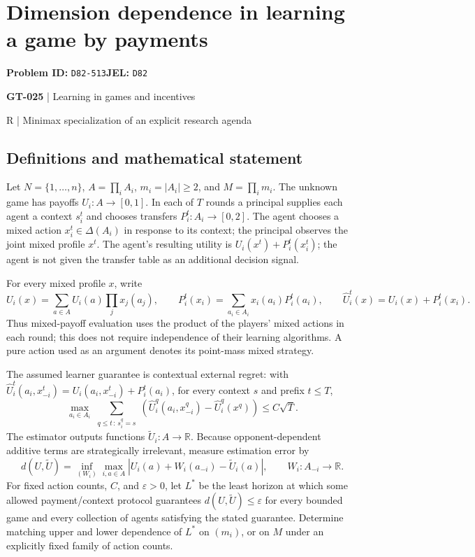 \documentclass[11pt,a4paper]{article}
\newcommand{\R}{\mathbb R}
\begin{document}
\section*{Dimension dependence in learning a game by payments}
\textbf{Problem ID:} \texttt{D82-513}\quad \textbf{JEL:} \texttt{D82}\par
\label{problem:OP-0155}
\label{game:GT-025}
{\sffamily\small\color{muted}
{\sffamily\small\color{muted}\textbf{GT-025} | Learning in games and incentives\par R | Minimax specialization of an explicit research agenda\par}
\par}
\subsection*{Definitions and mathematical statement}
Let $N=\{1,\ldots,n\}$, $A=\prod_i A_i$, $m_i=|A_i|\geq2$, and $M=\prod_i m_i$. The unknown game has payoffs $U_i:A\to[0,1]$. In each of $T$ rounds a principal supplies each agent a context $s_i^t$ and chooses transfers $P_i^t:A_i\to[0,2]$. The agent chooses a mixed action $x_i^t\in\Delta(A_i)$ in response to its context; the principal observes the joint mixed profile $x^t$. The agent's resulting utility is $U_i(x^t)+P_i^t(x_i^t)$; the agent is not given the transfer table as an additional decision signal.

For every mixed profile $x$, write
\[
 U_i(x)=\sum_{a\in A}U_i(a)\prod_j x_j(a_j),
 \qquad P_i^t(x_i)=\sum_{a_i\in A_i}x_i(a_i)P_i^t(a_i),
 \qquad \widehat U_i^t(x)=U_i(x)+P_i^t(x_i).
\]
Thus mixed-payoff evaluation uses the product of the players' mixed actions in each round; this does not require independence of their learning algorithms. A pure action used as an argument denotes its point-mass mixed strategy.

The assumed learner guarantee is contextual external regret: with $\widehat U_i^t(a_i,x_{-i}^t)=U_i(a_i,x_{-i}^t)+P_i^t(a_i)$, for every context $s$ and prefix $t\leq T$,
\[
 \max_{a_i\in A_i}\sum_{\substack{q\leq t\, :\,s_i^q=s}}
 \left(\widehat U_i^q(a_i,x_{-i}^q)-\widehat U_i^q(x^q)\right)
 \leq C\sqrt T.
\]
The estimator outputs functions $\widetilde U_i:A\to\R$. Because opponent-dependent additive terms are strategically irrelevant, measure estimation error by
\[
 d(U,\widetilde U)=\inf_{(W_i)}\max_{i,a\in A}
 \left|U_i(a)+W_i(a_{-i})-\widetilde U_i(a)\right|,
 \qquad W_i:A_{-i}\to\mathbb R.
\]
For fixed action counts, $C$, and $\varepsilon>0$, let $L^*$ be the least horizon at which some allowed payment/context protocol guarantees $d(U,\widetilde U)\leq\varepsilon$ for every bounded game and every collection of agents satisfying the stated guarantee. Determine matching upper and lower dependence of $L^*$ on $(m_i)$, or on $M$ under an explicitly fixed family of action counts.
\end{document}
